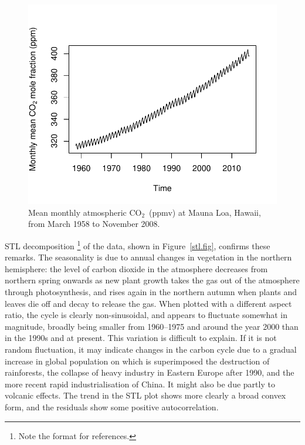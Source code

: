 \documentclass[a4paper,11pt]{article}\usepackage[]{graphicx}\usepackage[]{color}
\makeatletter
\def\maxwidth{ %
  \ifdim\Gin@nat@width>\linewidth
    \linewidth
  \else
    \Gin@nat@width
  \fi
}
\newenvironment{knitrout}{}{} %
\def\CO{{CO$_{2}$}}
\makeatother
\begin{document}
\begin{figure}[h]
\begin{center}
\begin{knitrout}
\color{fgcolor}
\includegraphics[width=\maxwidth]{figure/CO2-figinit-1} 

\end{knitrout}
\end{center}
\caption{Mean monthly atmospheric \CO\ (ppmv) at Mauna Loa, Hawaii, from March 1958 to November 2008.}
\label{data.fig}
\end{figure}

STL decomposition \citep{STL:1990}\footnote{Note the format for references.} of the data, shown in Figure~\ref{stl.fig}, confirms these remarks.  The seasonality is due to annual changes in vegetation in the northern hemisphere: the level of carbon dioxide in the atmosphere decreases from northern spring onwards as new plant growth takes the gas out of the atmosphere through photosynthesis, and rises again in the northern autumn when plants and leaves die off and decay to release the gas. When plotted with a different aspect ratio, the cycle is clearly non-sinusoidal, and appears to fluctuate somewhat in magnitude, broadly being smaller from 1960--1975 and around the year 2000 than in the 1990s and at present.  This variation is difficult to explain.  If it is not random fluctuation, it may indicate changes in the carbon cycle due to a gradual increase in global population on which is superimposed the destruction of rainforests, the collapse of heavy industry in Eastern Europe after 1990, and the more recent rapid industrialisation of China.  It might also be due partly to volcanic effects.  The trend in the STL plot shows more clearly a broad convex form, and the residuals show some positive autocorrelation. 
\end{document}
